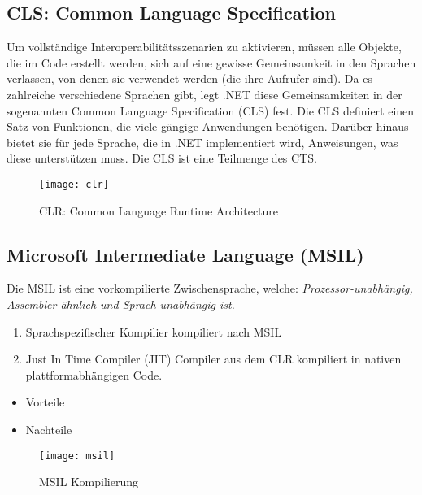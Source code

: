 \subsection{CLS: Common Language Specification}
 Um vollständige Interoperabilitätsszenarien zu aktivieren, müssen alle Objekte, die im Code erstellt werden, sich auf eine gewisse Gemeinsamkeit in den Sprachen verlassen, von denen sie verwendet werden (die ihre Aufrufer sind). Da es zahlreiche verschiedene Sprachen gibt, legt .NET diese Gemeinsamkeiten in der sogenannten Common Language Specification (CLS) fest. Die CLS definiert einen Satz von Funktionen, die viele gängige Anwendungen benötigen. Darüber hinaus bietet sie für jede Sprache, die in .NET implementiert wird, Anweisungen, was diese unterstützen muss. Die CLS ist eine Teilmenge des CTS.

\begin{figure}[h!]
	\centering
	\texttt{[image: clr]}
    \caption{CLR: Common Language Runtime Architecture}
\end{figure}

\subsection{Microsoft Intermediate Language (MSIL)}
Die MSIL ist eine vorkompilierte Zwischensprache, welche: \textit{Prozessor-unabhängig, Assembler-ähnlich und Sprach-unabhängig ist.}

\begin{enumerate}
  \item Sprachspezifischer Kompilier kompiliert nach MSIL
  \item Just In Time Compiler (JIT) Compiler aus dem CLR kompiliert in nativen plattformabhängigen Code.
\end{enumerate}

\begin{itemize}
  \itemsep -0.5em 
  \item Vorteile
  \item Nachteile
\end{itemize}

\begin{figure}[h!]
	\centering
	\texttt{[image: msil]}
    \caption{MSIL Kompilierung}
\end{figure}

